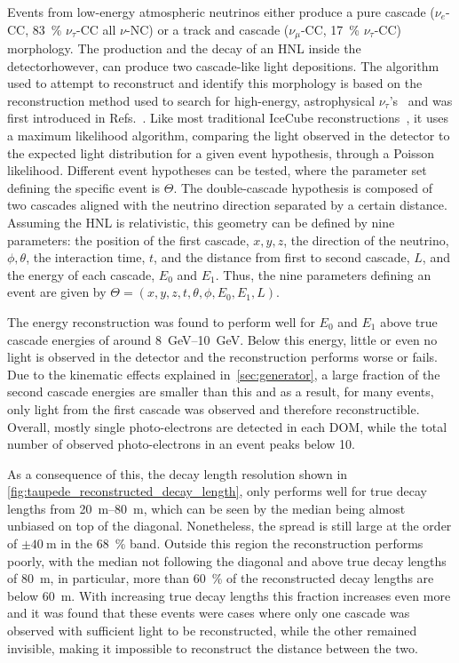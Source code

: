 \documentclass[
    aps,
    prd,
    reprint,
    amsmath,
    amssymb,
    nofootinbib,
    linenumbers,
    superscriptaddress,
    floatfix
]{revtex4-2}
\newcommand{\gev}{\giga\electronvolt}
\providecommand{\DIFaddtex}[1]{{\protect\color{blue}\uwave{#1}}} %
\providecommand{\DIFaddbegin}{} %
\providecommand{\DIFaddend}{} %
\providecommand{\DIFadd}[1]{\texorpdfstring{\DIFaddtex{#1}}{#1}} %
\newcommand{\DIFaddincludegraphics}[2][]{{\color{blue}\fbox{\DIFOincludegraphics[#1]{#2}}}} %
\DeclareRobustCommand{\DIFaddbegin}{\DIFOaddbegin \let\includegraphics\DIFaddincludegraphics} %
\DeclareRobustCommand{\DIFaddend}{\DIFOaddend \let\includegraphics\DIFOincludegraphics} %
\begin{document}
Events from low-energy atmospheric neutrinos either produce a pure cascade ($\nu_{e}$-CC, \SI{83}{\percent} $\nu_{\tau}$-CC all $\nu$-NC) or a track and cascade ($\nu_{\mu}$-CC, \SI{17}{\percent} $\nu_{\tau}$-CC) morphology. The production and the decay of an HNL inside the detector\DIFaddbegin \DIFadd{, }\DIFaddend however, can produce two cascade-like light depositions. The algorithm used to attempt to reconstruct and identify this morphology is based on the reconstruction method used to search for high-energy, astrophysical $\nu_{\tau}$'s~\cite{Abbasi:2020zmr} and was first introduced in Refs.~\cite{PHallen, MUsner}. Like most traditional IceCube reconstructions~\cite{IceCube:2013dkx,IceCube:2024csv}, it uses a maximum likelihood algorithm, comparing the light observed in the detector to the expected light distribution for a given event hypothesis, through a Poisson likelihood. Different event hypotheses can be tested, where the parameter set defining the specific event is $\Theta$. The double-cascade hypothesis is composed of two cascades aligned with the neutrino direction separated by a certain distance. Assuming the HNL is relativistic, this geometry can be defined by nine parameters: the position of the first cascade, $x, y, z$, the direction of the neutrino, $\phi, \theta$, the interaction time, $t$, and the distance from first to second cascade, $L$, and the energy of each cascade, $E_0$ and $E_1$. Thus, the nine parameters defining an event are given by $\Theta = (x, y, z, t, \theta, \phi, E_0, E_1, L)$.

The energy reconstruction was found to perform well for $E_0$ and $E_1$ above true cascade energies of around \SIrange{8}{10}{\gev}. Below this energy, little or even no light is observed in the detector and the reconstruction performs worse or fails. Due to the kinematic effects explained in~\cref{sec:generator}, a large fraction of the second cascade energies are smaller than this and as a result, for many events, only light from the first cascade was observed and therefore reconstructible. Overall, mostly single photo-electrons are detected in each DOM, while the total number of observed photo-electrons in an event peaks below 10.

As a consequence of this, the decay length resolution shown in \cref{fig:taupede_reconstructed_decay_length}, only performs well for true decay lengths from \SIrange{20}{80}{\meter}, which can be seen by the median being almost unbiased on top of the diagonal. Nonetheless, the spread is still large at the order of $\pm \SI{40}{\meter}$ in the \SI{68}{\percent} band. Outside this region the reconstruction performs poorly, with the median not following the diagonal and above true decay lengths of \SI{80}{\meter}, in particular, more than \SI{60}{\percent} of the reconstructed decay lengths are below \SI{60}{\meter}. With increasing true decay lengths this fraction increases even more and it was found that these events were cases where only one cascade was observed with sufficient light to be reconstructed, while the other remained invisible, making it impossible to reconstruct the distance between the two.
\end{document}
